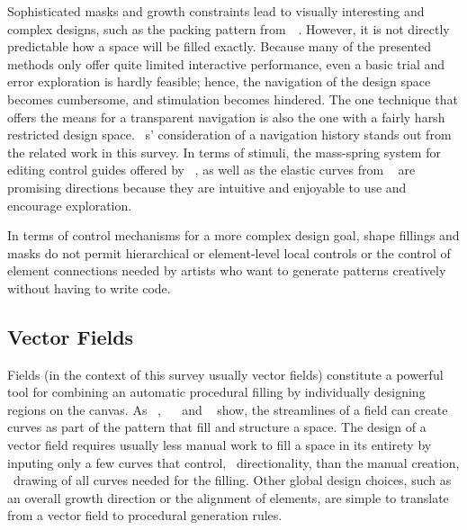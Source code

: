Sophisticated masks and growth constraints lead to visually interesting and complex designs, such as the packing pattern from~\citeauthor*{saputra_2018_rde}~\cite{saputra_2018_rde}. However, it is not directly predictable how a space will be filled exactly. Because many of the presented methods only offer quite limited interactive performance, even a basic trial and error exploration is hardly feasible; hence, the navigation of the design space becomes cumbersome, and stimulation becomes hindered. The one technique \cite{santoni_2016_ggp} that offers the means for a transparent navigation is also the one with a fairly harsh restricted design space. \citeauthor*{santoni_2016_ggp}~\cite{santoni_2016_ggp}s' consideration of a navigation history stands out from the related work in this survey. In terms of stimuli, the mass-spring system for editing control guides offered by \citeauthor*{benes_2011_gpm}~\cite{benes_2011_gpm}, as well as the elastic curves from \citeauthor*{zehnder_2016_dso}~\cite{zehnder_2016_dso} are promising directions because they are intuitive and enjoyable to use and encourage exploration.

In terms of control mechanisms for a more complex design goal, shape fillings and masks do not permit hierarchical or element-level local controls or the control of element connections needed by artists who want to generate patterns creatively without having to write code.


\subsection{Vector Fields}
\label{subsubsec:analysis_creative_means_fields}

Fields (in the context of this survey usually vector fields) constitute a powerful tool for combining an automatic procedural filling by individually designing regions on the canvas. As \citeauthor*{hsu_2020_aef}~\cite{hsu_2020_aef}, ~\citeauthor*{saputra_2017_ffo}~\cite{saputra_2017_ffo} and \citeauthor*{gieseke_2017_ooo}~\cite{gieseke_2017_ooo} show, the streamlines of a field can create curves as part of the pattern that fill and structure a space. The design of a vector field requires usually less manual work to fill a space in its entirety by inputing only a few curves that control, \eg~directionality, than the manual creation, \eg~drawing of all curves needed for the filling. Other global design choices, such as an overall growth direction or the alignment of elements, are simple to translate from a vector field to procedural generation rules.

